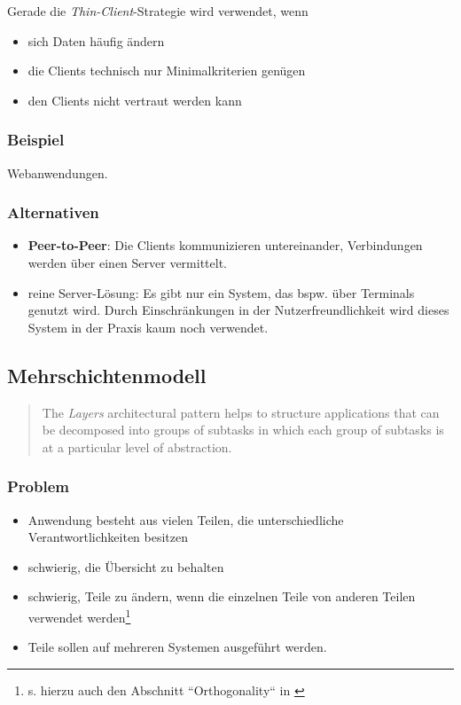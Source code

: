 Gerade die \textit{Thin-Client}-Strategie wird verwendet, wenn

\begin{itemize}
    \item sich Daten häufig ändern
    \item die Clients technisch nur Minimalkriterien genügen
    \item den Clients nicht vertraut werden kann
\end{itemize}

\subsubsection*{Beispiel}
Webanwendungen.

\subsubsection*{Alternativen}
\begin{itemize}
    \item \textbf{Peer-to-Peer}: Die Clients kommunizieren untereinander, Verbindungen werden über einen Server  vermittelt.
    \item reine Server-Lösung: Es gibt nur ein System, das bspw. über Terminals genutzt wird.
    Durch Einschränkungen in der Nutzerfreundlichkeit wird dieses System in der Praxis kaum noch verwendet.
\end{itemize}


\subsection{Mehrschichtenmodell}

\blockquote[{\cite[31, Hervorhebung i.O.]{BMRS96}}]{
    The \textit{Layers} architectural pattern helps to structure applications that can be decomposed into groups of subtasks in which each group of subtasks is at a particular level of abstraction.
}

\subsubsection*{Problem}
\begin{itemize}
    \item Anwendung besteht aus vielen Teilen, die unterschiedliche Verantwortlichkeiten besitzen
    \item schwierig, die Übersicht zu behalten
    \item schwierig, Teile zu ändern, wenn die einzelnen Teile von anderen Teilen verwendet werden\footnote{
     s. hierzu auch den Abschnitt ``Orthogonality`` in \cite[39 ff.]{TH19}
    }
    \item Teile sollen auf mehreren Systemen ausgeführt werden.
\end{itemize}

